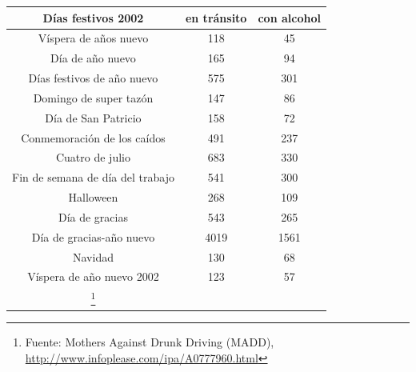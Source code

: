 \documentclass[10pt,twoside]{article}
\begin{document}
\begin{enumerate}
\begin{center}
\begin{tabular}{ccc}
Días festivos 2002 & en tránsito & con alcohol \\ 
\hline 
Víspera de años nuevo & 118 & 45 \\ 
Día de año nuevo & 165 & 94 \\ 
Días festivos de año nuevo & 575 & 301 \\ 
Domingo de super tazón & 147 & 86 \\ 
Día de San Patricio & 158 & 72 \\ 
Conmemoración de los caídos & 491 & 237 \\ 
Cuatro de julio & 683 & 330 \\ 
Fin de semana de día del trabajo & 541 & 300 \\ 
Halloween & 268 & 109 \\ 
Día de gracias & 543 & 265 \\ 
Día de gracias-año nuevo & 4019 & 1561 \\ 
Navidad & 130 & 68 \\ 
Víspera de año nuevo 2002 & 123 & 57 \\ 
\hline \footnote{Fuente: Mothers Against Drunk Driving (MADD), \url{http://www.infoplease.com/ipa/A0777960.html}}
\end{tabular}
\end{center}
\end{enumerate}
\end{document}
